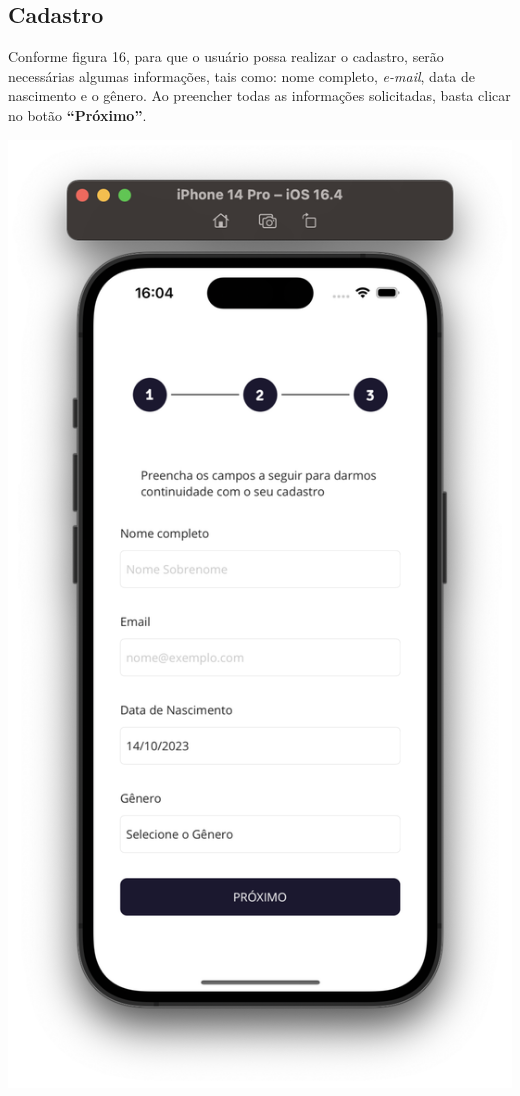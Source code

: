 \begin{center}
\begin{minipage}{\textwidth}
            \label{fig:uml}
        \end{minipage}
    \end{center}    

\subsection{Cadastro}

Conforme figura 16, para que o usuário possa realizar o cadastro, serão necessárias algumas informações, tais como: nome completo, \textit{e-mail}, data de nascimento e o gênero. Ao preencher todas as informações solicitadas, basta clicar no botão \textbf{“Próximo”}.

    \begin{center}
        \begin{minipage}{0.3\textwidth}
            \centering
            \includegraphics[scale=0.17]{figs/figura16.png}

\end{minipage}
\end{center}
